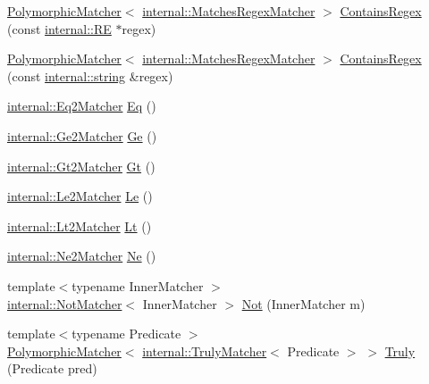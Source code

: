 \begin{DoxyCompactItemize}
\item 
\hyperlink{classtesting_1_1PolymorphicMatcher}{Polymorphic\+Matcher}$<$ \hyperlink{classtesting_1_1internal_1_1MatchesRegexMatcher}{internal\+::\+Matches\+Regex\+Matcher} $>$ \hyperlink{namespacetesting_a899838630a71376aa071dfd7c500f2ca}{Contains\+Regex} (const \hyperlink{classtesting_1_1internal_1_1RE}{internal\+::\+RE} $\ast$regex)
\item 
\hyperlink{classtesting_1_1PolymorphicMatcher}{Polymorphic\+Matcher}$<$ \hyperlink{classtesting_1_1internal_1_1MatchesRegexMatcher}{internal\+::\+Matches\+Regex\+Matcher} $>$ \hyperlink{namespacetesting_ad8efafa15630a8274f41f5e22f8f0e49}{Contains\+Regex} (const \hyperlink{namespacetesting_1_1internal_a8e8ff5b11e64078831112677156cb111}{internal\+::string} \&regex)
\item 
\hyperlink{classtesting_1_1internal_1_1Eq2Matcher}{internal\+::\+Eq2\+Matcher} \hyperlink{namespacetesting_aa7771a34f092fd6f1dca2c82fb2a36a1}{Eq} ()
\item 
\hyperlink{classtesting_1_1internal_1_1Ge2Matcher}{internal\+::\+Ge2\+Matcher} \hyperlink{namespacetesting_a8cc0a6519e30bedf52c6e53c71e18265}{Ge} ()
\item 
\hyperlink{classtesting_1_1internal_1_1Gt2Matcher}{internal\+::\+Gt2\+Matcher} \hyperlink{namespacetesting_a3eaae6408f77ba7d87ca2d6a21dbde77}{Gt} ()
\item 
\hyperlink{classtesting_1_1internal_1_1Le2Matcher}{internal\+::\+Le2\+Matcher} \hyperlink{namespacetesting_a04def1c627ea7e3fce2f08cb06e83ebc}{Le} ()
\item 
\hyperlink{classtesting_1_1internal_1_1Lt2Matcher}{internal\+::\+Lt2\+Matcher} \hyperlink{namespacetesting_a3b4d6d29d715c1bf219163f5206b53d4}{Lt} ()
\item 
\hyperlink{classtesting_1_1internal_1_1Ne2Matcher}{internal\+::\+Ne2\+Matcher} \hyperlink{namespacetesting_a0cde8994764617eebc751e682c28d4ae}{Ne} ()
\item 
{\footnotesize template$<$typename Inner\+Matcher $>$ }\\\hyperlink{classtesting_1_1internal_1_1NotMatcher}{internal\+::\+Not\+Matcher}$<$ Inner\+Matcher $>$ \hyperlink{namespacetesting_a3d7d0dda7e51b13fe2f5aa28e23ed6b6}{Not} (Inner\+Matcher m)
\item 
{\footnotesize template$<$typename Predicate $>$ }\\\hyperlink{classtesting_1_1PolymorphicMatcher}{Polymorphic\+Matcher}$<$ \hyperlink{classtesting_1_1internal_1_1TrulyMatcher}{internal\+::\+Truly\+Matcher}$<$ Predicate $>$ $>$ \hyperlink{namespacetesting_a5faf05cfaae6074439960048e478b1c8}{Truly} (Predicate pred)

\end{DoxyCompactItemize}
